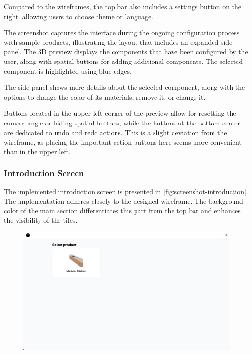 Compared to the wireframes, the top bar also includes a settings button on the right, allowing users to choose theme or language.

The screenshot captures the interface during the ongoing configuration process with sample products, illustrating the layout that includes an expanded side panel. The 3D preview displays the components that have been configured by the user, along with spatial buttons for adding additional components. The selected component is highlighted using blue edges.

The side panel shows more details about the selected component, along with the options to change the color of its materials, remove it, or change it.

Buttons located in the upper left corner of the preview allow for resetting the camera angle or hiding spatial buttons, while the buttons at the bottom center are dedicated to undo and redo actions. This is a slight deviation from the wireframe, as placing the important action buttons here seems more convenient than in the upper left.


\subsubsection{Introduction Screen}

The implemented introduction screen is presented in \autoref{fig:screenshot-introduction}. The implementation adheres closely to the designed wireframe. The background color of the main section differentiates this part from the top bar and enhances the visibility of the tiles.

\begin{figure}[h]
\centering
\includegraphics[width=\textwidth]{images/screenshot_introduction.png}
\label{fig:screenshot-introduction}
\end{figure}

